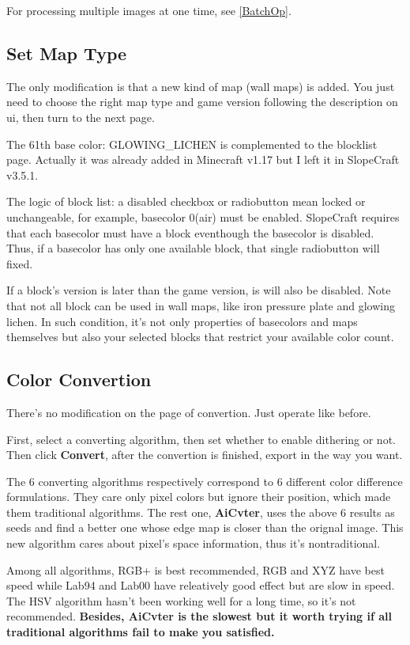 \documentclass{article}
\begin{document}
    For processing multiple images at one time, see \ref{BatchOp}.

    \subsection{Set Map Type}
    The only modification is that a new kind of map (wall maps) is added. You just need to choose the right map type and game version following the description on ui, then turn to the next page.

    The 61th base color: GLOWING\_LICHEN is complemented to the blocklist page. Actually it was already added in Minecraft v1.17 but I left it in SlopeCraft v3.5.1.

    The logic of block list: a disabled checkbox or radiobutton mean locked or unchangeable, for example, basecolor 0(air) must be enabled. SlopeCraft requires that each basecolor must have a block eventhough the basecolor is disabled. Thus, if a basecolor has only one available block, that single radiobutton will fixed.
    
    If a block's version is later than the game version, is will also be disabled. Note that not all block can be used in wall maps, like iron pressure plate and glowing lichen. In such condition, it's not only properties of basecolors and maps themselves but also your selected blocks that restrict your available color count.

    \subsection{Color Convertion}
    There's no modification on the page of convertion. Just operate like before.
    
    First, select a converting algorithm, then set whether to enable dithering or not. Then click \textbf{Convert}, after the convertion is finished, export in the way you want.

    The 6 converting algorithms respectively correspond to 6 different color difference formulations. They care only pixel colors but ignore their position, which made them traditional algorithms. The rest one, \textbf{AiCvter}, uses the above 6 results as seeds and find a better one whose edge map is closer than the orignal image. This new algorithm cares about pixel's space information, thus it's nontraditional.
    
    Among all algorithms, RGB+ is best recommended, RGB and XYZ have best speed while Lab94 and Lab00 have releatively good effect but are slow in speed. The HSV algorithm hasn't been working well for a long time, so it's not recommended. \textbf{Besides, AiCvter is the slowest but it worth trying if all traditional algorithms fail to make you satisfied.}
    
\end{document}
